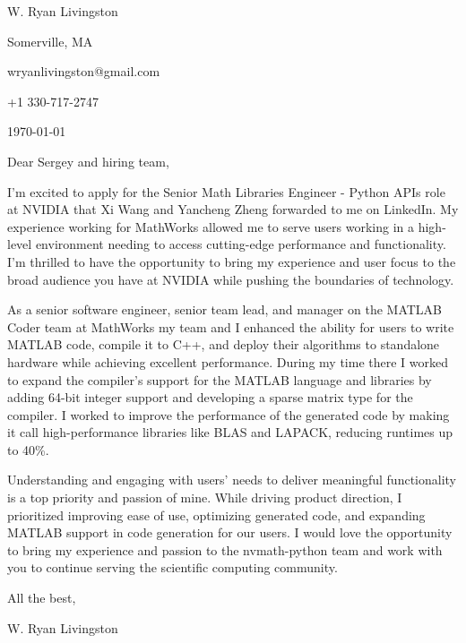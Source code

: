 \documentclass[
    10pt %
]{article}
\begin{document}
\begin{minipage}{\linewidth}
W. Ryan Livingston

Somerville, MA

wryanlivingston@gmail.com

+1 330-717-2747 %

\today
\end{minipage}

Dear Sergey and hiring team,

I'm excited to apply for the Senior Math Libraries Engineer - Python APIs role at NVIDIA that Xi Wang and Yancheng Zheng forwarded to me on LinkedIn. My experience working for MathWorks allowed me to serve users working in a high-level environment needing to access cutting-edge performance and functionality. I'm thrilled to have the opportunity to bring my experience and user focus to the broad audience you have at NVIDIA while pushing the boundaries of technology.

As a senior software engineer, senior team lead, and manager on the MATLAB Coder team at MathWorks my team and I enhanced the ability for users to write MATLAB code, compile it to C++, and deploy their algorithms to standalone hardware while achieving excellent performance. During my time there I worked to expand the compiler's support for the MATLAB language and libraries by adding 64-bit integer support and developing a sparse matrix type for the compiler. I worked to improve the performance of the generated code by making it call high-performance libraries like BLAS and LAPACK, reducing runtimes up to 40\%.

Understanding and engaging with users' needs to deliver meaningful functionality is a top priority and passion of mine. While driving product direction, I prioritized improving ease of use, optimizing generated code, and expanding MATLAB support in code generation for our users. I would love the opportunity to bring my experience and passion to the nvmath-python team and work with you to continue serving the scientific computing community.

All the best,

W. Ryan Livingston
\end{document}
